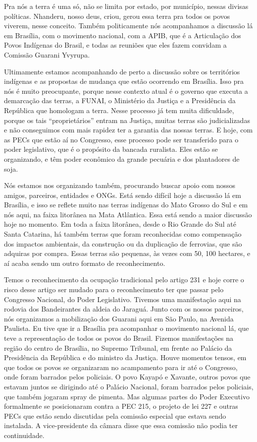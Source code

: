 Pra nós a terra é uma só, não se limita por estado, por município,
nessas divisas políticas. Nhanderu, nosso deus, criou, gerou essa terra
pra todos os povos viverem, nesse conceito. Também politicamente nós
acompanhamos a discussão lá em Brasília, com o movimento nacional, com
a APIB, que é a Articulação dos Povos Indígenas do Brasil, e todas as
reuniões que eles fazem convidam a Comissão Guarani Yvyrupa.

Ultimamente estamos acompanhando de perto a discussão sobre os
territórios indígenas e as propostas de mudança que estão ocorrendo em
Brasília. Isso pra nós é muito preocupante, porque nesse contexto atual
é o governo que executa a demarcação das terras, a FUNAI, o Ministério
da Justiça e a Presidência da República que homologam a terra. Nesse
processo já tem muita dificuldade, porque os tais ``proprietários''
entram na Justiça, muitas terras são judicializadas e não conseguimos
com mais rapidez ter a garantia das nossas terras. E hoje, com as PECs
que estão aí no Congresso, esse processo pode ser transferido para o
poder legislativo, que é o propósito da bancada ruralista. Eles estão
se organizando, e têm poder econômico da grande pecuária e dos
plantadores de soja. 

Nós estamos nos organizando também, procurando buscar apoio com nossos
amigos, parceiros, entidades e ONGs. Está sendo difícil hoje a
discussão lá em Brasília, e isso se reflete muito nas terras indígenas
do Mato Grosso do Sul e em nós aqui, na faixa litorânea na Mata Atlântica.
Essa está sendo a maior discussão hoje no momento. Em toda a faixa
litorânea, desde o Rio Grande do Sul até Santa Catarina, há também
terras que foram reconhecidas como compensação dos impactos ambientais,
da construção ou da duplicação de ferrovias, que são adquiras por
compra. Essas terras são pequenas, às vezes com 50, 100 hectares, e aí
acaba sendo um outro formato de reconhecimento.

Temos o reconhecimento da ocupação tradicional pelo artigo 231 e hoje
corre o risco desse artigo ser mudado para o reconhecimento ter que
passar pelo Congresso Nacional, do Poder Legislativo. Tivemos uma
manifestação aqui na rodovia dos Bandeirantes da aldeia do Jaraguá.
Junto com os nossos parceiros, nós organizamos a mobilização dos
Guarani aqui em São Paulo, na Avenida Paulista. Eu tive que ir a
Brasília pra acompanhar o movimento nacional lá, que teve a
representação de todos os povos do Brasil. Fizemos manifestações na
região do centro de Brasília, no Supremo Tribunal, em frente ao Palácio
da Presidência da República e do ministro da Justiça. Houve momentos
tensos, em que todos os povos se organizaram no acampamento para ir até
o Congresso, onde foram barrados pelos policiais. O povo Kayapó e
Xavante, outros povos que estavam juntos se dirigindo até o Palácio
Nacional, foram barrados pelos policiais, que também jogaram spray de
pimenta. Mas algumas partes do Poder Executivo formalmente se
posicionaram contra a PEC 215, o projeto de lei 227 e outras PECs que
estão sendo discutidas pela comissão especial que estava sendo
instalada. A vice-presidente da câmara disse que essa comissão não
podia ter continuidade.

